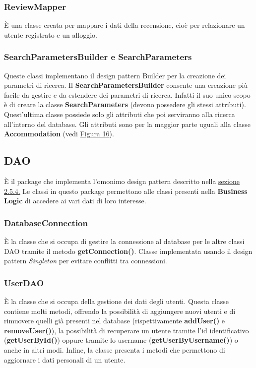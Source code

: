 \documentclass[10pt]{article}
\begin{document}
\subsubsection{ReviewMapper}

\`E una classe creata per mappare i dati della recensione, cioè per relazionare un utente registrato e un alloggio.

\subsubsection{SearchParametersBuilder e SearchParameters}

Queste classi implementano il design pattern Builder per la creazione dei parametri di ricerca. Il \textbf{SearchParametersBuilder} consente una creazione più facile da gestire e da estendere dei parametri di ricerca. Infatti il suo unico scopo è di creare la classe \textbf{SearchParameters} (devono possedere gli stessi attributi). Quest'ultima classe possiede solo gli attributi che poi serviranno alla ricerca all'interno del database. Gli attributi sono per la maggior parte uguali alla classe \textbf{Accommodation} (vedi \hyperref[fig:uml]{Figura 16}).

\subsection{DAO}

\`E il package che implementa l'omonimo design pattern descritto nella \hyperref[sezione 2.5.4.]{sezione 2.5.4.} Le classi in questo package permettono alle classi presenti nella \textbf{Business Logic} di accedere ai vari dati di loro interesse.

\subsubsection{DatabaseConnection}

\`E la classe che si occupa di gestire la connessione al database per le altre classi DAO tramite il metodo \textbf{getConnection()}. Classe implementata usando il design pattern \textit{Singleton} per evitare conflitti tra connessioni.

\subsubsection{UserDAO}

\`E la classe che si occupa della gestione dei dati degli utenti. Questa classe contiene molti metodi, offrendo la possibilità di aggiungere nuovi utenti e di rimuovere quelli già presenti nel database (rispettivamente \textbf{addUser()} e \textbf{removeUser()}), la possibilità di recuperare un utente tramite l'id identificativo (\textbf{getUserById()}) oppure tramite lo username (\textbf{getUserByUsername()}) o anche in altri modi. Infine, la classe presenta i metodi che permettono di aggiornare i dati personali di un utente.
\end{document}
